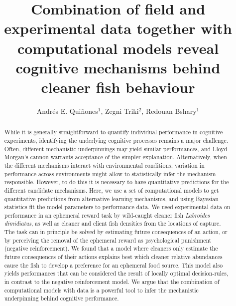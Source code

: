 \documentclass[]{rsos}%
\begin{document}
\title{Combination of field and experimental data together with computational models reveal cognitive mechanisms behind cleaner fish behaviour}

\author{
Andrés E. Quiñones$^{1}$,
Zegni Triki$^{2}$,
Redouan Bshary$^{1}$}

\address{
  $^{1}$Institute of Biology, University of Neuchâtel, Neuchâtel, Switzerland\\
  $^{2}$Department of Zoology, Stockholm University, Stockholm, Sweden}
\subject{
Behavioural ecology,
Cognitive ecology,
Animal behaviour}



\begin{abstract}
While it is generally straightforward to quantify individual performance in cognitive experiments, identifying the underlying cognitive processes remains a major challenge. Often, different mechanistic underpinnings may yield similar performances, and Lloyd Morgan's cannon warrants acceptance of the simpler explanation. Alternatively, when the different mechanisms interact with environmental conditions, variation in performance across environments might allow to statistically infer the mechanism responsible. However, to do this it is necessary to have quantitative predictions for the different candidate mechanisms. Here, we use a set of computational models to get quantitative predictions from alternative learning mechanisms, and using Bayesian statistics fit the model parameters to performance data. We used experimental data on performance in an ephemeral reward task by wild-caught cleaner fish \emph{Labroides dimidiatus}, as well as cleaner and client fish densities from the locations of capture. The task can in principle be solved by estimating future consequences of an action, or by perceiving the removal of the ephemeral reward as psychological punishment (negative reinforcement). We found that a model where cleaners only estimate the future consequences of their actions explains best which cleaner relative abundances cause the fish to develop a preference for an ephemeral food source. This model also yields performances that can be considered the result of locally optimal decision-rules, in contrast to the negative reinforcement model. We argue that the combination of computational models with data is a powerful tool to infer the mechanistic underpinning behind cognitive performance.
\end{abstract}
\end{document}

